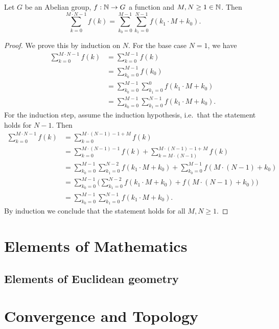 \documentclass{report}
\begin{document}
\begin{proposition} \label{sumAsDecimation}
Let $G$ be an Abelian group, $f:\mathbb{N}\to G$ a function and $M,N \geq 1 \in \mathbb{N}$. Then
\[ \sum_{k=0}^{M\cdot N-1}f(k) = \sum_{k_0 = 0}^{M-1}\sum_{k_1 = 0}^{N-1} f(k_1\cdot M + k_0). \]
\end{proposition}
\begin{proof}
We prove this by induction on $N$. For the base case $N=1$, we have
\begin{align*}
\sum_{k=0}^{M\cdot N-1}f(k) &= \sum_{k=0}^{M-1}f(k) \\
&= \sum_{k_0=0}^{M-1}f(k_0) \\
&= \sum_{k_0=0}^{M-1}\sum_{k_1 = 0}^{0}f(k_1 \cdot M + k_0) \\
&= \sum_{k_0=0}^{M-1}\sum_{k_1 = 0}^{N-1}f(k_1 \cdot M + k_0).
\end{align*}
For the induction step, assume the induction hypothesis, i.e.\ that the statement holds for $N-1$. Then
\begin{align*}
\sum_{k=0}^{M\cdot N-1}f(k) &= \sum_{k=0}^{M\cdot (N-1)-1 + M}f(k) \\
&= \sum_{k=0}^{M\cdot (N-1)-1}f(k) + \sum_{k=M\cdot (N-1)}^{M\cdot (N-1)-1 + M}f(k) \\
&= \sum_{k_0 = 0}^{M-1}\sum_{k_1 = 0}^{N-2} f(k_1\cdot M + k_0) + \sum_{k_0=0}^{M-1}f(M\cdot (N-1) + k_0) \\
&= \sum_{k_0 = 0}^{M-1}\Big(\sum_{k_1 = 0}^{N-2} f(k_1\cdot M + k_0) + f(M\cdot (N-1) + k_0)\Big) \\
&= \sum_{k_0 = 0}^{M-1}\sum_{k_1 = 0}^{N-1} f(k_1\cdot M + k_0).
\end{align*}
By induction we conclude that the statement holds for all $M,N \geq 1$.
\end{proof}



\part{Elements of Mathematics}
\setcounter{chapter}{0} %
\chapter{Elements of Euclidean geometry}


\part{Convergence and Topology}
\setcounter{chapter}{0} %

\end{document}
